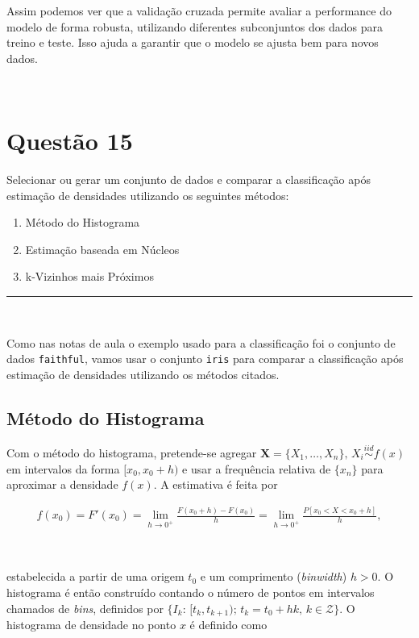 \documentclass[
  a4paperpaper,
]{article}
\providecommand{\tightlist}{%
  \setlength{\itemsep}{0pt}\setlength{\parskip}{0pt}}\usepackage{longtable,booktabs,array}
\begin{document}
Assim podemos ver que a validação cruzada permite avaliar a performance
do modelo de forma robusta, utilizando diferentes subconjuntos dos dados
para treino e teste. Isso ajuda a garantir que o modelo se ajusta bem
para novos dados.

~

\section{Questão 15}\label{questuxe3o-15}

Selecionar ou gerar um conjunto de dados e comparar a classificação após
estimação de densidades utilizando os seguintes métodos:

\begin{enumerate}
\def\labelenumi{\arabic{enumi}.}
\tightlist
\item
  Método do Histograma
\item
  Estimação baseada em Núcleos
\item
  k-Vizinhos mais Próximos
\end{enumerate}

\begin{center}\rule{0.5\linewidth}{0.5pt}\end{center}

~

Como nas notas de aula o exemplo usado para a classificação foi o
conjunto de dados \texttt{faithful}, vamos usar o conjunto \texttt{iris}
para comparar a classificação após estimação de densidades utilizando os
métodos citados.

\subsection{Método do Histograma}\label{muxe9todo-do-histograma}

Com o método do histograma, pretende-se agregar
\(\mathbf{X} = \{ X_1, \dots, X_n\}, \, X_i \overset{iid}{\sim} f(x)\)
em intervalos da forma \([ x_0, x_0+h)\) e usar a frequência relativa de
\(\{x_n\}\) para aproximar a densidade \(f(x)\). A estimativa é feita
por

\begin{align}
f(x_0) = F'(x_0) = \lim_{h\to 0^+} \frac{F(x_0 + h) - F(x_0)}{h} = \lim_{h\to 0^+} \frac{P[x_0 < X < x_0 + h]}{h} \label{eq:histograma},
\end{align}

~

\noindent estabelecida a partir de uma origem \(t_0\) e um comprimento
(\emph{binwidth}) \(h > 0\). O histograma é então construído contando o
número de pontos em intervalos chamados de \emph{bins}, definidos por
\(\{ I_k : \, [t_k, t_{k+1}); \, t_k = t_0 + hk, \, k \in \mathcal{Z} \}\).
O histograma de densidade no ponto \(x\) é definido como
\end{document}
